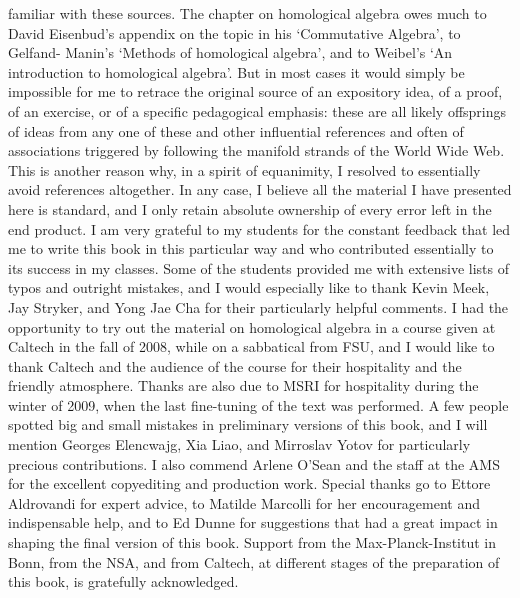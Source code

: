 familiar with these sources. The chapter on homological algebra owes
much to David Eisenbud's appendix on the topic in his `Commutative
Algebra', to Gelfand- Manin's `Methods of homological algebra', and to
Weibel's `An introduction to homological algebra'. But in most cases
it would simply be impossible for me to retrace the original source of
an expository idea, of a proof, of an exercise, or of a specific
pedagogical emphasis: these are all likely offsprings of ideas from
any one of these and other influential references and often of
associations triggered by following the manifold strands of the World
Wide Web. This is another reason why, in a spirit of equanimity, I
resolved to essentially avoid references altogether.  In any case, I
believe all the material I have presented here is standard, and I only
retain absolute ownership of every error left in the end product.  I
am very grateful to my students for the constant feedback that led me
to write this book in this particular way and who contributed
essentially to its success in my classes. Some of the students
provided me with extensive lists of typos and outright mistakes, and I
would especially like to thank Kevin Meek, Jay Stryker, and Yong Jae
Cha for their particularly helpful comments. I had the opportunity to
try out the material on homological algebra in a course given at
Caltech in the fall of 2008, while on a sabbatical from FSU, and I
would like to thank Caltech and the audience of the course for their
hospitality and the friendly atmosphere.  Thanks are also due to MSRI
for hospitality during the winter of 2009, when the last fine-tuning
of the text was performed.  A few people spotted big and small
mistakes in preliminary versions of this book, and I will mention
Georges Elencwajg, Xia Liao, and Mirroslav Yotov for particularly
precious contributions. I also commend Arlene O'Sean and the staff at
the AMS for the excellent copyediting and production work.  Special
thanks go to Ettore Aldrovandi for expert advice, to Matilde Marcolli
for her encouragement and indispensable help, and to Ed Dunne for
suggestions that had a great impact in shaping the final version of
this book.  Support from the Max-Planck-Institut in Bonn, from the
NSA, and from Caltech, at different stages of the preparation of this
book, is gratefully acknowledged.

